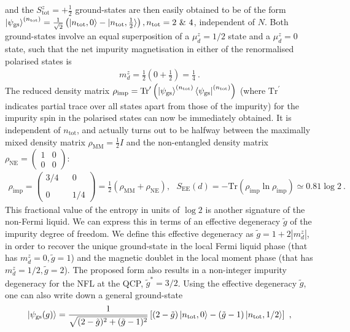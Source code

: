 and the \(S_\text{tot}^z = + \frac{1}{2}\) ground-states are then easily obtained to be of the form \(\ket{\psi_\text{gs}}^{(n_\text{tot})} = \frac{1}{\sqrt 2}\left(\ket{n_\text{tot}, 0} - \ket{n_\text{tot}, \frac{1}{2}}\right), n_\text{tot} = 2 ~\&~ 4\), independent of \(N\). Both ground-states involve an equal superposition of a \(\mu_d^z=1/2\) state and a \(\mu_d^z=0\) state, such that the net impurity magnetisation in either of the renormalised polarised states is
\begin{eqnarray}
	m_d^z = \frac{1}{2}\left( 0 + \frac{1}{2} \right) = \frac{1}{4}~.
\end{eqnarray}
The reduced density matrix \(\rho_\text{imp} = \text{Tr}^\prime\left(\ket{\psi_\text{gs}}^{(n_\text{tot})}\bra{\psi_\text{gs}}^{(n_\text{tot})}\right)\) (where \(\text{Tr}^\prime\) indicates partial trace over all states apart from those of the impurity) for the impurity spin in the polarised states can now be immediately obtained. It is independent of \(n_\text{tot}\), and actually turns out to be halfway between the maximally mixed density matrix \(\rho_\text{MM} = \frac{1}{2} I\) and the non-entangled density matrix \(\rho_\text{NE} = \begin{pmatrix} 1 & 0 \\ 0 & 0 \end{pmatrix} \):
\begin{eqnarray}
	\rho_\text{imp} = \begin{pmatrix} 3/4 && 0 \\ \\ 0 && 1/4 \end{pmatrix} = \frac{1}{2}\left(\rho_\text{MM} + \rho_\text{NE}\right), ~ ~ ~ S_\text{EE}(d) = -\text{Tr}\left(\rho_\text{imp} \ln \rho_\text{imp}\right) \simeq 0.81 \log 2 ~.
\end{eqnarray}
This fractional value of the entropy in units of \(\log 2\) is another signature of the non-Fermi liquid. We can express this in terms of an effective degeneracy \(\tilde g\) of the impurity degree of freedom. We define this effective degeneracy as \(\tilde g = 1 + 2|m_d^z|\), in order to recover the unique ground-state in the local Fermi liquid phase (that has \(m_d^z=0,\tilde g = 1\)) and the magnetic doublet in the local moment phase (that has \(m_d^z = 1/2, \tilde g =2\)). The proposed form also results in a non-integer impurity degeneracy for the NFL at the QCP, \(\tilde g^* = 3/2\). Using the effective degeneracy \(\tilde g\), one can also write down a general ground-state
\begin{eqnarray}\label{general-state}
	\ket{\psi_\text{gs}(g)} = \frac{1}{\sqrt{(2-\tilde g)^2 + (\tilde g-1)^2}}\left[(2-\tilde g)\ket{n_\text{tot},0} - (\tilde g - 1)\ket{n_\text{tot},1/2}\right]~,
\end{eqnarray}
